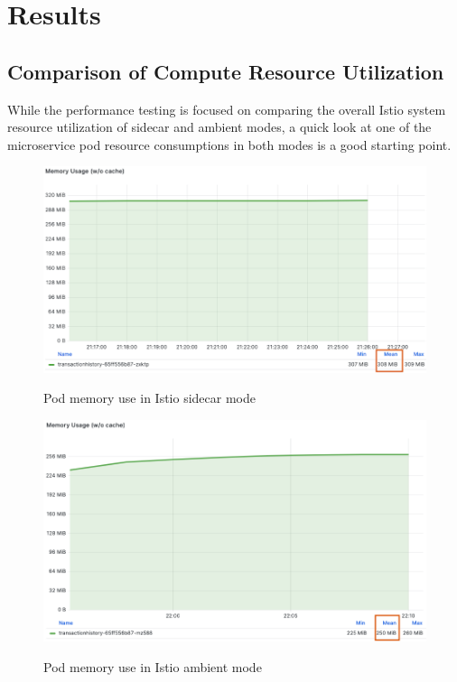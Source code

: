 \section{Results}
\subsection{Comparison of Compute Resource Utilization}
While the performance testing is focused on comparing the overall Istio system resource utilization of sidecar and ambient modes, a quick look at one of the microservice pod resource consumptions in both modes is a good starting point.

\begin{figure}[ht!]
    \centering
    \caption{Pod memory use in Istio sidecar mode}
    \includegraphics[width=0.95\linewidth]{resources/sidecar-pod-mem.png}
    \label{result:podMemUseSidecar}
\end{figure}

\begin{figure}[ht!]
    \centering
    \caption{Pod memory use in Istio ambient mode}
    \includegraphics[width=0.95\linewidth]{resources/ambient-pod-mem.png}
    \label{result:podMemUseAmbient}
\end{figure}

